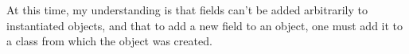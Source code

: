 At this time, my understanding is that fields can't be added arbitrarily
to instantiated objects, and that to add a new field to an object, one
must add it to a class from which the object was created.
